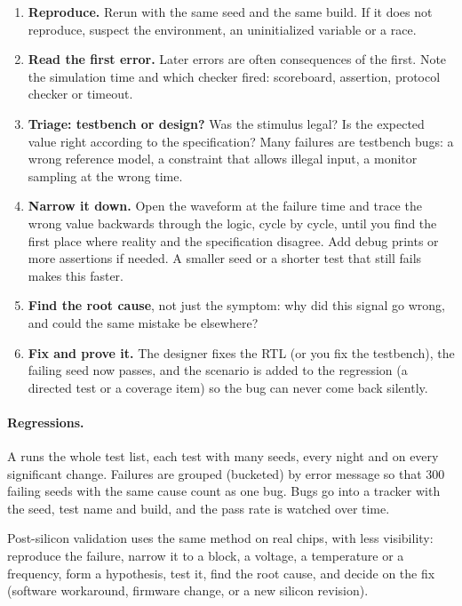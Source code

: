 \begin{enumerate}
  \item \textbf{Reproduce.} Rerun with the same seed and the same build. If it does not reproduce, suspect the environment, an uninitialized variable or a race.
  \item \textbf{Read the first error.} Later errors are often consequences of the first. Note the simulation time and which checker fired: scoreboard, assertion, protocol checker or timeout.
  \item \textbf{Triage: testbench or design?} Was the stimulus legal? Is the expected value right according to the specification? Many failures are testbench bugs: a wrong reference model, a constraint that allows illegal input, a monitor sampling at the wrong time.
  \item \textbf{Narrow it down.} Open the waveform at the failure time and trace the wrong value backwards through the logic, cycle by cycle, until you find the first place where reality and the specification disagree. Add debug prints or more assertions if needed. A smaller seed or a shorter test that still fails makes this faster.
  \item \textbf{Find the root cause}, not just the symptom: why did this signal go wrong, and could the same mistake be elsewhere?
  \item \textbf{Fix and prove it.} The designer fixes the RTL (or you fix the testbench), the failing seed now passes, and the scenario is added to the regression (a directed test or a coverage item) so the bug can never come back silently.
\end{enumerate}

\paragraph{Regressions.} A  runs the whole test list, each test with many seeds, every night and on every significant change. Failures are grouped (bucketed) by error message so that 300 failing seeds with the same cause count as one bug. Bugs go into a tracker with the seed, test name and build, and the pass rate is watched over time.

\begin{remember}
Post-silicon validation uses the same method on real chips, with less visibility: reproduce the failure, narrow it to a block, a voltage, a temperature or a frequency, form a hypothesis, test it, find the root cause, and decide on the fix (software workaround, firmware change, or a new silicon revision).
\end{remember}


